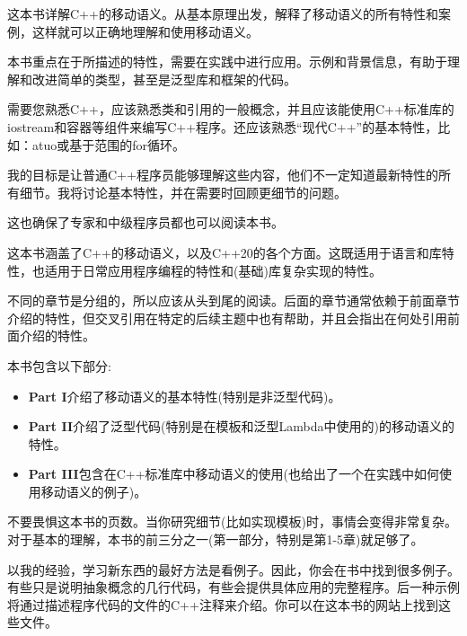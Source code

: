 
这本书详解C++的移动语义。从基本原理出发，解释了移动语义的所有特性和案例，这样就可以正确地理解和使用移动语义。\par

本书重点在于所描述的特性，需要在实践中进行应用。示例和背景信息，有助于理解和改进简单的类型，甚至是泛型库和框架的代码。\par


需要您熟悉C++，应该熟悉类和引用的一般概念，并且应该能使用C++标准库的iostream和容器等组件来编写C++程序。还应该熟悉“现代C++”的基本特性，比如：atuo或基于范围的for循环。\par

我的目标是让普通C++程序员能够理解这些内容，他们不一定知道最新特性的所有细节。我将讨论基本特性，并在需要时回顾更细节的问题。\par

这也确保了专家和中级程序员都也可以阅读本书。\par


这本书涵盖了C++的移动语义，以及C++20的各个方面。这既适用于语言和库特性，也适用于日常应用程序编程的特性和(基础)库复杂实现的特性。\par

不同的章节是分组的，所以应该从头到尾的阅读。后面的章节通常依赖于前面章节介绍的特性，但交叉引用在特定的后续主题中也有帮助，并且会指出在何处引用前面介绍的特性。\par

本书包含以下部分:\par
\begin{itemize}
  \item \textbf{Part I}介绍了移动语义的基本特性(特别是非泛型代码)。
  \item \textbf{Part II}介绍了泛型代码(特别是在模板和泛型Lambda中使用的)的移动语义的特性。
  \item \textbf{Part III}包含在C++标准库中移动语义的使用(也给出了一个在实践中如何使用移动语义的例子)。
\end{itemize}


不要畏惧这本书的页数。当你研究细节(比如实现模板)时，事情会变得非常复杂。对于基本的理解，本书的前三分之一(第一部分，特别是第1-5章)就足够了。\par

以我的经验，学习新东西的最好方法是看例子。因此，你会在书中找到很多例子。有些只是说明抽象概念的几行代码，有些会提供具体应用的完整程序。后一种示例将通过描述程序代码的文件的C++注释来介绍。你可以在这本书的网站上找到这些文件。\par

